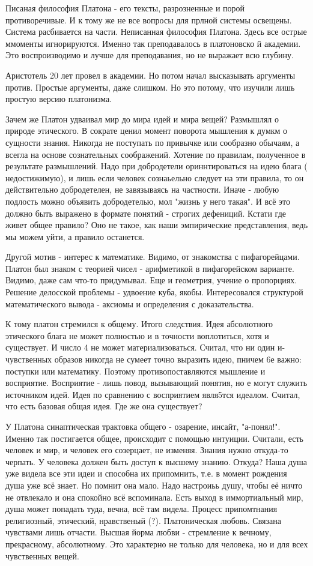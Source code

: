 Писаная философия Платона - его тексты, разрозненные и порой противоречивые. И к тому же не все вопросы для прлной системы освещены. Система расбивается на части.
Неписанная философия Платона. Здесь все острые ммоменты игнорируются. Именно так преподавалось в платоновско й академии. Это воспроизводимо и лучше для преподавания, но не выражает всю глубину.

Аристотель 20 лет провел в академии. Но потом начал высказывать аргументы против. Простые аргументы, даже слишком. Но это потому, что изучили лишь простую версию платонизма.

Зачем же Платон удваивал мир до мира идей и мира вещей?
Размышлял о природе этического. В сократе ценил момент поворота мышления к думкм о сущности знания. Никогда не поступать по привычке или сообразно обычаям, а всегла на основе сознательных соображений. 
Хотение по правилам, полученное в результате размышлений. Надо при добродетели ориннтироваться на идею блага ( недостижимую), и лишь если человек сознаьельно следует на эти правила, то он действительно добродетелен, не завязываясь на частности. 
Иначе - любую подлость можно объявить добродетелью, мол "жизнь у него такая". 
И всё это должно быть выражено в формате понятий - строгих дефениций. Кстати где живет общее правило? Оно не такое, как наши эмпирические представления, ведь мы можем уйти, а правило останется.

Другой мотив - интерес к математике. Видимо, от знакомства с пифагорейцами. 
Платон был знаком с теорией чисел - арифметикой в пифагорейском варианте. Видимо, даже сам что-то придумывал. Еще и геометрия, учение о пропорциях. 
Решение делосской проблемы - удвоение куба, якобы. Интересовался структурой математического вывода - аксиомы и определения с доказательства.

К тому платон стремился к общему. Итого следствия.
Идея абсолютного этического блага не может полностью и в точности воплотиться, хотя и существует. И число 4 не может материализоваться. Считал, что ни один и- чувственных образов никогда не сумеет точно выразить идею, пничем 6е важно: поступки или математику. Поэтому противопоставляются мышление и восприятие. 
Восприятие - лишь повод, вызывающий понятия, но е могут служить источником идей. Идея по сравнению с восприятием явля5тся идеалом. Считал, что есть базовая общая идея. Где же она существует?

У Платона синаптическая трактовка общего - озарение, инсайт, "а-понял!". Именно так постигается общее, происходит с помощью интуиции. Считали, есть человек и мир, и человек его  созерцает, не изменяя. 
Знания нужно откуда-то черпать. У человека должен быть доступ к высшему знанию. Откуда? Наша душа уже видела все эти идеи и способна их припомнить, т.е. в момент рождения душа уже всё знает. 
Но помнит она мало. Надо настроиьь душу, чтобы её ничто не отвлекало и она спокойно всё вспоминала.
Есть выход в иммортиальный мир, душа может попадать туда, вечна, всё там видела. Процесс припомтнания религиозный, этический, нравственый (?). Платоническая любовь. Связана чувствами лишь отчасти. Высшая йорма любви - стремление к вечному, прекрасному, абсолютному. Это характерно не только для человека, но и для всех чувственных вещей.
